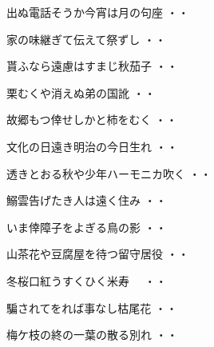 \vspace{0.6cm}
\begin{shiika}出ぬ電話そうか今宵は月の句座
\hfill{・・}\end{shiika}
\vspace{0.6cm}
\begin{shiika}家の味継ぎて伝えて祭ずし
\hfill{・・}\end{shiika}
\vspace{0.6cm}
\begin{shiika}貰ふなら遠慮はすまじ秋茄子
\hfill{・・}\end{shiika}
\vspace{0.6cm}
\begin{shiika}栗むくや消えぬ弟の国訛
\hfill{・・}\end{shiika}
\vspace{0.6cm}
\begin{shiika}故郷もつ倖せしかと柿をむく
\hfill{・・}\end{shiika}
\vspace{0.6cm}
\begin{shiika}文化の日遠き明治の今日生れ
\hfill{・・}\end{shiika}
\vspace{0.6cm}
\begin{shiika}透きとおる秋や少年ハーモニカ吹く
\hfill{・・}\end{shiika}
\vspace{0.6cm}
\begin{shiika}鰯雲告げたき人は遠く住み
\hfill{・・}\end{shiika}
\vspace{0.6cm}
\begin{shiika}いま倖障子をよぎる鳥の影
\hfill{・・}\end{shiika}
\vspace{0.6cm}
\begin{shiika}山茶花や豆腐屋を待つ留守居役
\hfill{・・}\end{shiika}
\vspace{0.6cm}
\begin{shiika}冬桜口紅うすくひく米寿　
\hfill{・・}\end{shiika}
\vspace{0.6cm}
\begin{shiika}騙されてをれば事なし枯尾花
\hfill{・・}\end{shiika}
\vspace{0.6cm}
\begin{shiika}梅ケ枝の終の一葉の散る別れ
\hfill{・・}\end{shiika}
\vspace{0.6cm}


